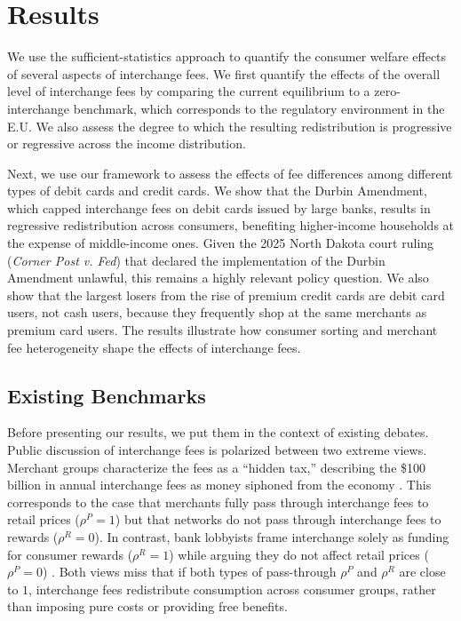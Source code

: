 \documentclass[main.tex]{subfiles}
\begin{document}
\section{Results}
\label{sec:Results}
We use the sufficient-statistics approach to quantify the consumer welfare effects of several aspects of interchange fees.
We first quantify the effects of the overall level of interchange fees by comparing the current equilibrium to a zero-interchange benchmark, which corresponds to the regulatory environment in the E.U.
We also assess the degree to which the resulting redistribution is progressive or regressive across the income distribution.

Next, we use our framework to assess the effects of fee differences among different types of debit cards and credit cards.
We show that the Durbin Amendment, which capped interchange fees on debit cards issued by large banks, results in regressive redistribution across consumers, benefiting higher-income households at the expense of middle-income ones.
Given the 2025 North Dakota court ruling (\textit{Corner Post v. Fed}) that declared the implementation of the Durbin Amendment unlawful, this remains a highly relevant policy question.
We also show that the largest losers from the rise of premium credit cards are debit card users, not cash users, because they frequently shop at the same merchants as premium card users.
The results illustrate how consumer sorting and merchant fee heterogeneity shape the effects of interchange fees.

\subsection{Existing Benchmarks}

Before presenting our results, we put them in the context of existing debates.
Public discussion of interchange fees is polarized between two extreme views.
Merchant groups characterize the fees as a ``hidden tax,'' describing the \$100 billion in annual interchange fees as money siphoned from the economy \citep{MerchantPaymentsCoalition2024}.
This corresponds to the case that merchants fully pass through interchange fees to retail prices ($\rho^P=1$) but that networks do not pass through interchange fees to rewards ($\rho^R=0$).
In contrast, bank lobbyists frame interchange solely as funding for consumer rewards ($\rho^R=1$) while arguing they do not affect retail prices ($\rho^P=0$) \citep{BPI2024}. 
Both views miss that if both types of pass-through $\rho^P$ and $\rho^R$ are close to $1$, interchange fees redistribute consumption across consumer groups, rather than imposing pure costs or providing free benefits.
\end{document}
